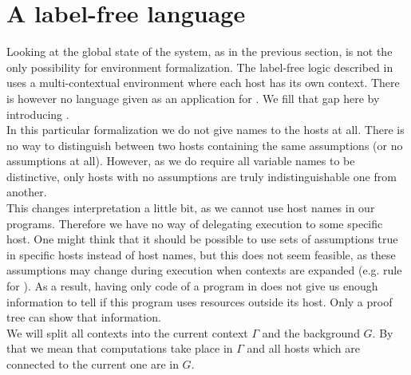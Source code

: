 \section{A label-free language}
Looking at the global state of the system, as in the previous section, is not the only possibility for environment formalization. The label-free logic \logicLF{} described in \cite{labelfree} uses a multi-contextual environment where each host has its own context. There is however no language given as an application for \logicLF{}. We fill that gap here by introducing \langLF{}.\\

In this particular formalization we do not give names to the hosts at all. There is no way to distinguish between two hosts containing the same assumptions (or no assumptions at all). However, as we do require all variable names to be distinctive, only hosts with no assumptions are truly indistinguishable one from another.\\

This changes interpretation a little bit, as we cannot use host names in our programs. Therefore we have no way of delegating execution to some specific host. One might think that it should be possible to use sets of assumptions true in specific hosts instead of host names, but this does not seem feasible, as these assumptions may change during execution when contexts are expanded (e.g. rule for ). As a result, having only code of a program in \langLF{} does not give us enough information to tell if this program uses resources outside its host. Only a proof tree can show that information.\\

We will split all contexts into the current context $\Gamma$ and the background $G$. By that we mean that computations take place in $\Gamma$ and all hosts which are connected to the current one are in $G$.\\


